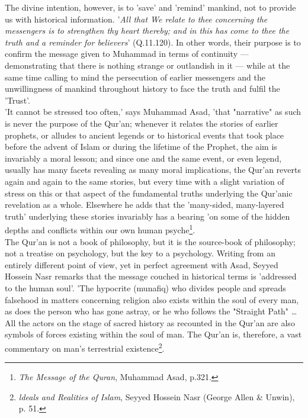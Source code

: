\documentclass[11pt, b5paper, twoside]{book}
\begin{document}
The divine intention, however, is to 'save' and 'remind' mankind, not to provide us with historical 
information. '\emph{All that We relate to thee concerning the messengers is to strengthen thy heart 
thereby; and in this has come to thee the truth and a reminder for believers}' (Q.11.120). In other 
words, their purpose is to confirm the message given to Muhammad in terms of continuity --- 
demonstrating that there is nothing strange or outlandish in it --- while at the same time calling to 
mind the persecution of earlier messengers and the unwillingness of mankind throughout history to 
face the truth and fulfil the 'Trust'. \\

'It cannot be stressed too often,' says Muhammad Asad, 'that "narrative" as such is never the purpose 
of the Qur'an; whenever it relates the stories of earlier prophets, or alludes to ancient legends or 
to historical events that took place before the advent of Islam or during the lifetime of the 
Prophet, the aim is invariably a moral lesson; and since one and the same event, or even legend, 
usually has many facets revealing as many moral implications, the Qur'an reverts again and again to 
the same stories, but every time with a slight variation of stress on this or that aspect of the 
fundamental truths underlying the Qur'anic revelation as a whole. Elsewhere he adds that the 
'many-sided, many-layered truth' underlying these stories invariably has a bearing 'on some of the 
hidden depths and conflicts within our own human psyche\footnote{\emph{The Message of the Quran}, Muhammad Asad, p.321.}.\\

The Qur'an is not a book of philosophy, but it is the source-book of philosophy; not a treatise on 
psychology, but the key to a psychology. Writing from an entirely different point of view, yet in 
perfect agreement with Asad, Seyyed Hossein Nasr remarks that the message couched in historical terms 
is 'addressed to the human soul'. 'The hypocrite (munafiq) who divides people and spreads falsehood 
in matters concerning religion also exists within the soul of every man, as does the person who has 
gone astray, or he who follows the "Straight Path" \ldots{} All the actors on the stage of sacred history 
as recounted in the Qur'an are also symbols of forces existing within the soul of man. The Qur'an is, 
therefore, a vast commentary on man's terrestrial existence\footnote{\emph{ldeals and Realities of Islam}, Seyyed Hossein Nasr (George Allen \& Unwin), p. 51.}.\\
\end{document}
